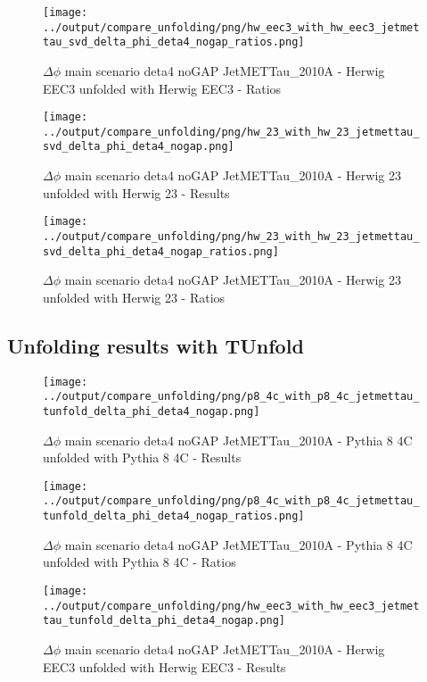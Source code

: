 \documentclass[11pt]{book}
\begin{document}
\begin{figure}[ht]
\centering
\texttt{[image: ../output/compare\_unfolding/png/hw\_eec3\_with\_hw\_eec3\_jetmettau\_svd\_delta\_phi\_deta4\_nogap\_ratios.png]}
\caption{$\Delta\phi$ main scenario deta4 noGAP JetMETTau\_2010A - Herwig EEC3 unfolded with Herwig EEC3 - Ratios}
\label{hw_eec3_hw_eec3_jetmettau_svd_delta_phi_deta4_nogap_b}
\end{figure}

\begin{figure}[ht]
\centering
\texttt{[image: ../output/compare\_unfolding/png/hw\_23\_with\_hw\_23\_jetmettau\_svd\_delta\_phi\_deta4\_nogap.png]}
\caption{$\Delta\phi$ main scenario deta4 noGAP JetMETTau\_2010A - Herwig 23 unfolded with Herwig 23 - Results}
\label{hw_23_hw_23_jetmettau_svd_delta_phi_deta4_nogap_a}
\end{figure}

\begin{figure}[ht]
\centering
\texttt{[image: ../output/compare\_unfolding/png/hw\_23\_with\_hw\_23\_jetmettau\_svd\_delta\_phi\_deta4\_nogap\_ratios.png]}
\caption{$\Delta\phi$ main scenario deta4 noGAP JetMETTau\_2010A - Herwig 23 unfolded with Herwig 23 - Ratios}
\label{hw_23_hw_23_jetmettau_svd_delta_phi_deta4_nogap_b}
\end{figure}


\clearpage
\subsection{Unfolding results with TUnfold}

\begin{figure}[ht]
\centering
\texttt{[image: ../output/compare\_unfolding/png/p8\_4c\_with\_p8\_4c\_jetmettau\_tunfold\_delta\_phi\_deta4\_nogap.png]}
\caption{$\Delta\phi$ main scenario deta4 noGAP JetMETTau\_2010A - Pythia 8 4C unfolded with Pythia 8 4C - Results}
\label{p8_p8_jetmettau_tunfold_delta_phi_deta4_nogap_a}
\end{figure}

\begin{figure}[ht]
\centering
\texttt{[image: ../output/compare\_unfolding/png/p8\_4c\_with\_p8\_4c\_jetmettau\_tunfold\_delta\_phi\_deta4\_nogap\_ratios.png]}
\caption{$\Delta\phi$ main scenario deta4 noGAP JetMETTau\_2010A - Pythia 8 4C unfolded with Pythia 8 4C - Ratios}
\label{p8_p8_jetmettau_tunfold_delta_phi_deta4_nogap_b}
\end{figure}

\begin{figure}[ht]
\centering
\texttt{[image: ../output/compare\_unfolding/png/hw\_eec3\_with\_hw\_eec3\_jetmettau\_tunfold\_delta\_phi\_deta4\_nogap.png]}
\caption{$\Delta\phi$ main scenario deta4 noGAP JetMETTau\_2010A - Herwig EEC3 unfolded with Herwig EEC3 - Results}
\label{hw_eec3_hw_eec3_jetmettau_tunfold_delta_phi_deta4_nogap_a}
\end{figure}
\end{document}
